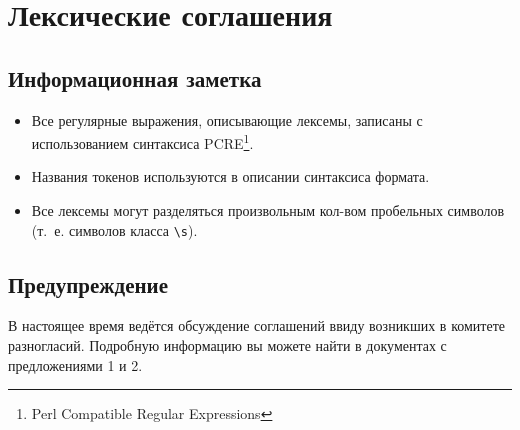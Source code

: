 \section{Лексические соглашения}
\subsection*{Информационная заметка}
\begin{itemize}
	\item Все регулярные выражения, описывающие лексемы, записаны с использованием синтаксиса PCRE\footnote{Perl Compatible Regular Expressions}.
	\item Названия токенов используются в описании синтаксиса формата.
	\item Все лексемы могут разделяться произвольным кол-вом пробельных символов (т.~е. символов класса \verb/\s/).
\end{itemize}

\subsection*{Предупреждение}
В настоящее время ведётся обсуждение соглашений ввиду возникших в комитете разногласий. Подробную информацию вы можете найти в документах с предложениями 1 и 2.
